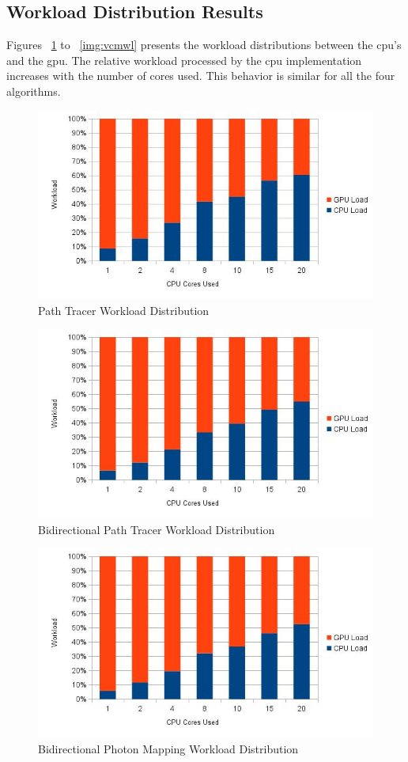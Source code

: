 \subsection{Workload Distribution Results}

Figures ~\ref{img:ptwl} to ~\ref{img:vcmwl} presents the workload distributions between the \gls{cpu}'s and the \gls{gpu}. The relative workload processed by the \gls{cpu} implementation increases with the number of cores used. This behavior is similar for all the four algorithms.

\begin{figure}[H]
\centering
\includegraphics[width=0.8\linewidth]{img/ptwl.jpg}
\caption{\label{img:ptwl} Path Tracer Workload Distribution}
\end{figure}

\begin{figure}[H]
\centering
\includegraphics[width=0.8\linewidth]{img/bptwl.jpg}
\caption{\label{img:bptwl} Bidirectional Path Tracer Workload Distribution}
\end{figure}

\begin{figure}[H]
\centering
\includegraphics[width=0.8\linewidth]{img/bpmwl.jpg}
\caption{\label{img:bpmwl} Bidirectional Photon Mapping Workload Distribution}
\end{figure}

